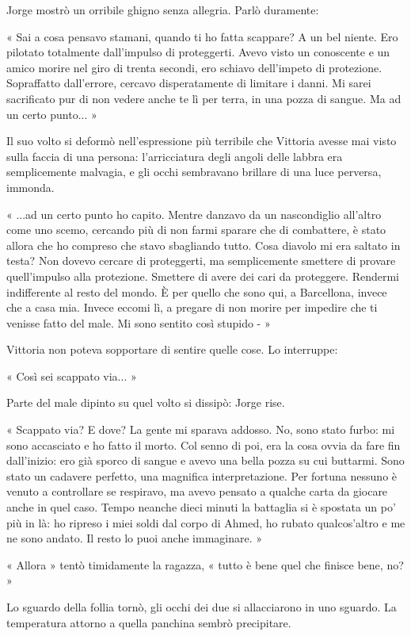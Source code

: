 Jorge mostrò un orribile ghigno senza allegria. Parlò duramente:

« Sai a cosa pensavo stamani, quando ti ho fatta scappare? A un bel niente. Ero pilotato totalmente dall'impulso di proteggerti. Avevo visto un conoscente e un amico morire nel giro di trenta secondi, ero schiavo dell'impeto di protezione. Sopraffatto dall'errore, cercavo disperatamente di limitare i danni. Mi sarei sacrificato pur di non vedere anche te lì per terra, in una pozza di sangue. Ma ad un certo punto... »

Il suo volto si deformò nell'espressione più terribile che Vittoria avesse mai visto sulla faccia di una persona: l'arricciatura degli angoli delle labbra era semplicemente malvagia, e gli occhi sembravano brillare di una luce perversa, immonda.

« ...ad un certo punto ho capito. Mentre danzavo da un nascondiglio all'altro come uno scemo, cercando più di non farmi sparare che di combattere, è stato allora che ho compreso che stavo sbagliando tutto. Cosa diavolo mi era saltato in testa? Non dovevo cercare di proteggerti, ma semplicemente smettere di provare quell'impulso alla protezione. Smettere di avere dei cari da proteggere. Rendermi indifferente al resto del mondo. È per quello che sono qui, a Barcellona, invece che a casa mia. Invece eccomi lì, a pregare di non morire per impedire che ti venisse fatto del male. Mi sono sentito così stupido - »

Vittoria non poteva sopportare di sentire quelle cose. Lo interruppe:

« Così sei scappato via... »

Parte del male dipinto su quel volto si dissipò: Jorge rise.

« Scappato via? E dove? La gente mi sparava addosso. No, sono stato furbo: mi sono accasciato e ho fatto il morto. Col senno di poi, era la cosa ovvia da fare fin dall'inizio: ero già sporco di sangue e avevo una bella pozza su cui buttarmi. Sono stato un cadavere perfetto, una magnifica interpretazione. Per fortuna nessuno è venuto a controllare se respiravo, ma avevo pensato a qualche carta da giocare anche in quel caso. Tempo neanche dieci minuti la battaglia si è spostata un po' più in là: ho ripreso i miei soldi dal corpo di Ahmed, ho rubato qualcos'altro e me ne sono andato. Il resto lo puoi anche immaginare. »

« Allora » tentò timidamente la ragazza, « tutto è bene quel che finisce bene, no? »

Lo sguardo della follia tornò, gli occhi dei due si allacciarono in uno sguardo. La temperatura attorno a quella panchina sembrò precipitare.

